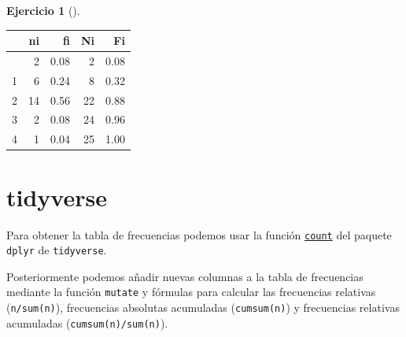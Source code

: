 \documentclass[
  spanish,
  a4paper,
]{scrreport}
\newenvironment{Shaded}{\begin{snugshade}}{\end{snugshade}}
\newcommand{\CommentTok}[1]{\textcolor[rgb]{0.37,0.37,0.37}{#1}}
\newcommand{\FunctionTok}[1]{\textcolor[rgb]{0.28,0.35,0.67}{#1}}
\newcommand{\NormalTok}[1]{\textcolor[rgb]{0.00,0.23,0.31}{#1}}
\newcommand{\OtherTok}[1]{\textcolor[rgb]{0.00,0.23,0.31}{#1}}
\newcommand{\SpecialCharTok}[1]{\textcolor[rgb]{0.37,0.37,0.37}{#1}}
\theoremstyle{definition}
\newtheorem{exercise}{Ejercicio}[chapter]
\theoremstyle{remark}
\begin{document}
\begin{exercise}[]
\begin{enumerate}
\begin{tcolorbox}
\begin{Shaded}
\end{Shaded}

  \begin{longtable}[]{@{}lrrrr@{}}
  \toprule\noalign{}
  & ni & fi & Ni & Fi \\
  \midrule\noalign{}
  \endhead
  \bottomrule\noalign{}
  \endlastfoot
  0 & 2 & 0.08 & 2 & 0.08 \\
  1 & 6 & 0.24 & 8 & 0.32 \\
  2 & 14 & 0.56 & 22 & 0.88 \\
  3 & 2 & 0.08 & 24 & 0.96 \\
  4 & 1 & 0.04 & 25 & 1.00 \\
  \end{longtable}

  \section{tidyverse}

  Para obtener la tabla de frecuencias podemos usar la función
  \href{https://aprendeconalf.es/manual-r/06-preprocesamiento.html\#conteo-del-n\%C3\%BAmero-de-observaciones}{\texttt{count}}
  del paquete \texttt{dplyr} de \texttt{tidyverse}.

  Posteriormente podemos añadir nuevas columnas a la tabla de
  frecuencias mediante la función \texttt{mutate} y fórmulas para
  calcular las frecuencias relativas (\texttt{n/sum(n)}), frecuencias
  absolutas acumuladas (\texttt{cumsum(n)}) y frecuencias relativas
  acumuladas (\texttt{cumsum(n)/sum(n)}).


\end{tcolorbox}
\end{enumerate}
\end{exercise}
\end{document}
